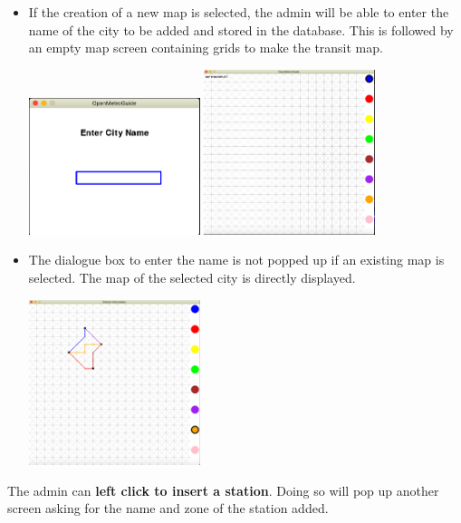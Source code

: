 \documentclass[fontsize=11pt]{article}
\begin{document}
    \begin{itemize}
        \item If the creation of a new map is selected, the admin will be able to enter the name of the city to be added and stored in the database. This is followed by an empty map screen containing grids to make the transit map.
        \begin{center}
            \includegraphics[width = 5cm]{enter city name.png} \quad
            \includegraphics[width = 5cm]{blank map screen.png}
        \end{center}

        \item The dialogue box to enter the name is not popped up if an existing map is selected. The map of the selected city is directly displayed.
        \\
        \begin{center}
            \includegraphics[width = 5cm]{Sample Map.png}
        \end{center}
    \end{itemize}
    The admin can \textbf{left click to insert a station}. Doing so will pop up another screen asking for the name and zone of the station added. \\
\end{document}
